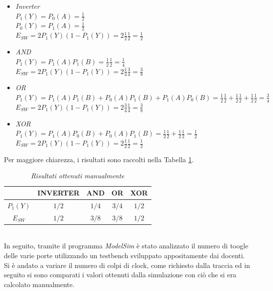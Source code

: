 \begin{itemize}
	\item \textit{Inverter} \\
	$P_{1}(Y)=P_{0}(A)=\frac{1}{2}$ \\
	$P_{0}(Y)=P_{1}(A)=\frac{1}{2}$ \\
	$E_{SW}=2P_{1}(Y)(1-P_{1}(Y))=2\frac{1}{2}\frac{1}{2}=\frac{1}{2}$\\
	\item \textit{AND} \\
	$P_{1}(Y)=P_{1}(A)P_{1}(B)=\frac{1}{2}\frac{1}{2}=\frac{1}{4}$ \\
	$E_{SW}=2P_{1}(Y)(1-P_{1}(Y))=2\frac{1}{4}\frac{3}{4}=\frac{3}{8}$\\
	\item \textit{OR} \\
	$P_{1}(Y)=P_{1}(A)P_{1}(B)+P_{0}(A)P_{1}(B)+P_{1}(A)P_{0}(B)=\frac{1}{2}\frac{1}{2}+\frac{1}{2}\frac{1}{2}+\frac{1}{2}\frac{1}{2}=\frac{3}{4}$ \\
	$E_{SW}=2P_{1}(Y)(1-P_{1}(Y))=2\frac{3}{4}\frac{1}{4}=\frac{3}{8}$\\
	\item \textit{XOR} \\
	$P_{1}(Y)=P_{1}(A)P_{0}(B)+P_{0}(A)P_{1}(B)=\frac{1}{2}\frac{1}{2}+\frac{1}{2}\frac{1}{2}=\frac{1}{2}$ \\
	$E_{SW}=2P_{1}(Y)(1-P_{1}(Y))=2\frac{1}{2}\frac{1}{2}=\frac{1}{2}$\\
\end{itemize}
Per maggiore chiarezza, i risultati sono raccolti nella Tabella \ref{Tab1_1}. \\
\begin{table}[!h]\footnotesize
	\centering
	\begin{tabular}{|c|c|c|c|c|}
		\hline
		 & \textbf{INVERTER}& \textbf{AND}& \textbf{OR} &\textbf{XOR}\\
		\hline
		$P_{1}(Y)$ & $1/2$  & $1/4$& $3/4$&$1/2$\\
		\hline
		$E_{SW}$& $1/2$ &$3/8$&$3/8$& $1/2$\\
		\hline
	\end{tabular}
	\caption{\textit{Risultati ottenuti manualmente}}
	\label{Tab1_1}
\end{table}\\
In seguito, tramite il programma \textit{ModelSim} è stato analizzato il numero di toogle delle varie porte utilizzando un testbench sviluppato appositamente dai docenti. Si è andato a variare il numero di colpi di clock, come richiesto dalla traccia ed in seguito si sono comparati i valori ottenuti dalla simulazione con ciò che si era calcolato manualmente.\\
